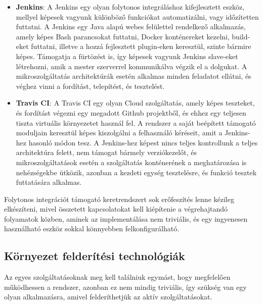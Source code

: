 \documentclass[11pt,magyar,a4paper,twoside,]{report}
\begin{document}
\begin{itemize}
\item
  \textbf{Jenkins}\citep{jenkins}: A Jenkins egy olyan folytonos
  integráláshoz kifejlesztett eszköz, mellyel képesek vagyunk különböző
  funkciókat automatizálni, vagy időzítetten futtatni. A Jenkins egy
  Java alapú webes felülettel rendelkező alkalmazás, amely képes Bash
  parancsokat futtatni, Docker konténereket kezelni, build-eket
  futtatni, illetve a hozzá fejlesztett plugin-eken keresztül, szinte
  bármire képes. Támogatja a fürtözést is, így képesek vagyunk Jenkins
  slave-eket létrehozni, amik a mester szerverrel kommunikálva végzik el
  a dolgukat. A mikroszolgáltatás architektúrák esetén alkalmas minden
  feladatot ellátni, és véghez vinni a fordítást, telepítést, és
  tesztelést.
\item
  \textbf{Travis CI}\citep{travis}: A Travis CI egy olyan Cloud
  szolgáltatás, amely képes teszteket, és fordítást végezni egy megadott
  Github projektből, és ehhez egy teljesen tiszta virtuális környezetet
  használ fel. A rendszer a saját beépített támogató moduljain keresztül
  képes kiszolgálni a felhasználó kéréseit, amit a Jenkins-hez hasonló
  módon tesz. A Jenkins-hez képest nincs teljes kontrollunk a teljes
  architektúra felett, nem támogat bármely verziókezelőt, és
  mikroszolgáltatások esetén a szolgáltatás konténerének a meghatározása
  is nehézségekbe ütközik, azonban a kezdeti egység tesztelésre, és
  funkció tesztek futtatására alkalmas.
\end{itemize}

Folytonos integrációt támogató keretrendszert sok erőfeszítés lenne
kézileg elkészíteni, mivel összetett kapcsolatokat kell kiépítenie a
végrehajtandó folyamatok közben, aminek az implementálása nem triviális,
és egy ingyenesen használható eszköz sokkal könnyebben
felkonfigurálható.

\subsection{Környezet felderítési
technológiák}\label{kuxf6rnyezet-felderuxedtuxe9si-technoluxf3giuxe1k}

Az egyes szolgáltatásoknak meg kell találniuk egymást, hogy megfelelően
működhessen a rendszer, azonban ez nem mindig triviális, így szükség van
egy olyan alkalmazásra, amivel felderíthetjük az aktív szolgáltatásokat.
\end{document}
